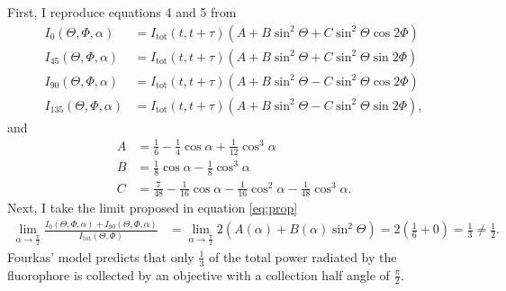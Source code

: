 \documentclass[11pt]{article}
\begin{document}
First, I reproduce equations 4 and 5 from \cite{fourkas}
\begin{subequations}
\begin{align}
    I_{0}(\Theta, \Phi, \alpha) &= I_{\text{tot}}(t, t+\tau)(A + B\sin^{2}{\Theta} + C\sin^{2}{\Theta} \cos{2 \Phi})\\
    I_{45}(\Theta, \Phi, \alpha) &= I_{\text{tot}}(t, t+\tau)(A + B\sin^{2}{\Theta} + C\sin^{2}{\Theta}\sin{2 \Phi})\\
    I_{90}(\Theta, \Phi, \alpha) &= I_{\text{tot}}(t, t+\tau)(A + B\sin^{2}{\Theta} - C\sin^{2}{\Theta} \cos{2 \Phi})\\
  I_{135}(\Theta, \Phi, \alpha) &= I_{\text{tot}}(t, t+\tau)(A + B\sin^{2}{\Theta} - C\sin^{2}{\Theta} \sin{2 \Phi}),
\end{align}\label{eq:int1}
\end{subequations}
and
\vspace{-1em}
\begin{subequations}
\begin{align}
  A &= \frac{1}{6} - \frac{1}{4}\cos\alpha + \frac{1}{12}\cos^3\alpha\\
  B &= \frac{1}{8}\cos\alpha - \frac{1}{8}\cos^3\alpha\\
  C &= \frac{7}{48} - \frac{1}{16} \cos{\alpha } - \frac{1}{16} \cos^{2}{\alpha } - \frac{1}{48} \cos^{3}{\alpha }.
\end{align}\label{eq:coeff1}
\end{subequations}
Next, I take the limit proposed in equation \ref{eq:prop}
\begin{align}
  \lim_{\alpha\rightarrow \frac{\pi}{2}} \frac{I_{0}(\Theta, \Phi, \alpha) + I_{90}(\Theta, \Phi, \alpha)}{I_{\text{tot}}(\Theta, \Phi)} &= \lim_{\alpha\rightarrow \frac{\pi}{2}} 2\left(A(\alpha) + B(\alpha)\sin^2\Theta\right) =2\left(\frac{1}{6} + 0\right) = \frac{1}{3} \neq \frac{1}{2}.
\end{align}
Fourkas' model predicts that only $\frac{1}{3}$ of the total power radiated by the
fluorophore is collected by an objective with a collection half angle of $\frac{\pi}{2}$.
\end{document}
